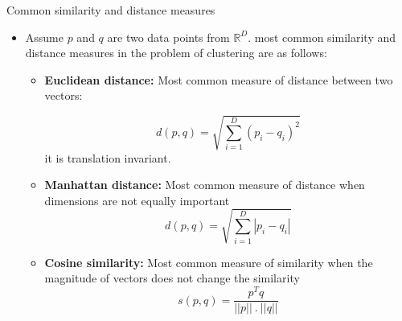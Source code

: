 \documentclass[serif, aspectratio=169]{beamer}
\begin{document}

\begin{frame}{Common similarity and distance measures}
    \begin{itemize}
        \item Assume \( p \) and \( q \) are two data points from $ \mathbb{R}^D$. most common similarity and distance measures in the problem of clustering are as follows:
        \begin{itemize}
            \item \textbf{Euclidean distance:} Most common measure of distance between two vectors:

            \[
            d(p,q)=\sqrt{{\sum_{i=1}^{D}{(p_i-q_i)^2}}}
            \]
            it is translation invariant.
            
            \item \textbf{Manhattan distance:} Most common measure of distance when dimensions are not equally important
            \[
            d(p,q)=\sqrt{\sum_{i=1}^{D} |p_i-q_i|}
            \]
            
            \item \textbf{Cosine similarity:} Most common measure of similarity when the magnitude of vectors does not change the similarity
            \[
            s( p,q)=\frac{p^T q}{||p|| \ . \ ||q||}
            \]

        \end{itemize}
    \end{itemize}
\end{frame}
\end{document}
